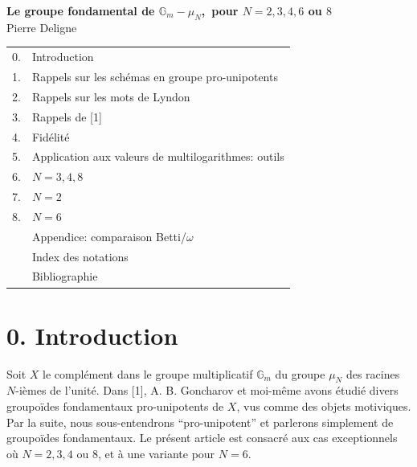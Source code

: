 \documentclass[10pt,a4paper]{article}
\newcommand{\Gm}{\mathbb G_m}
\theoremstyle{deligne}
\begin{document}
\begin{center}
{\Large\bfseries Le groupe fondamental de \(\Gm-\mu_N\),\ pour \(N=2,3,4,6\) ou \(8\)}\\[0.4em]
{\large Pierre Deligne}
\end{center}

\begin{center}
\begin{tabular}{rl}
0. & Introduction\\
1. & Rappels sur les schémas en groupe pro-unipotents\\
2. & Rappels sur les mots de Lyndon\\
3. & Rappels de [1]\\
4. & Fidélité\\
5. & Application aux valeurs de multilogarithmes: outils\\
6. & \(N=3,4,8\)\\
7. & \(N=2\)\\
8. & \(N=6\)\\
& Appendice: comparaison Betti/\(\omega\)\\
& Index des notations\\
& Bibliographie
\end{tabular}
\end{center}

\section*{0. Introduction}

Soit \(X\) le complément dans le groupe multiplicatif \(\Gm\) du groupe \(\mu_N\) des racines \(N\)-ièmes de l'unité. Dans [1], A. B. Goncharov et moi-même avons étudié divers groupoïdes fondamentaux pro-unipotents de \(X\), vus comme des objets motiviques. Par la suite, nous sous-entendrons ``pro-unipotent'' et parlerons simplement de groupoïdes fondamentaux. Le présent article est consacré aux cas exceptionnels où \(N=2,3,4\) ou \(8\), et à une variante pour \(N=6\).
\end{document}
